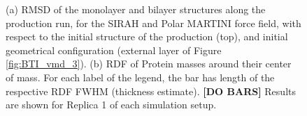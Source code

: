 \begin{figure}
\begin{minipage}[c]{0.48\textwidth}
    \end{minipage}
    \caption[Comparison of structural properties between monolayer and bilayer structures]{(a) RMSD of the monolayer and bilayer structures along the production run, for the SIRAH and Polar MARTINI force field, with respect to the initial structure of the production (top), and initial geometrical configuration (external layer of Figure \ref{fig:BTI_vmd_3}). (b) RDF of Protein masses around their center of mass. For each label of the legend, the bar has length of the respective RDF FWHM (thickness estimate). \textbf{[DO BARS]} Results are shown for Replica 1 of each simulation setup.}
\label{fig:mono_bi}
\end{figure}


